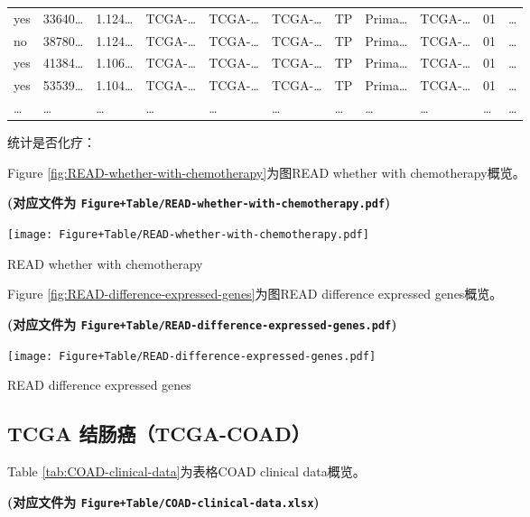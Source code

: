 \documentclass[
]{article}
\begin{document}
\begin{longtable}[]{@{}lllllllllll@{}}
yes & 33640\ldots{} & 1.124\ldots{} & TCGA-\ldots{} & TCGA-\ldots{} & TCGA-\ldots{} & TP & Prima\ldots{} & TCGA-\ldots{} & 01 & \ldots{}\tabularnewline
no & 38780\ldots{} & 1.124\ldots{} & TCGA-\ldots{} & TCGA-\ldots{} & TCGA-\ldots{} & TP & Prima\ldots{} & TCGA-\ldots{} & 01 & \ldots{}\tabularnewline
yes & 41384\ldots{} & 1.106\ldots{} & TCGA-\ldots{} & TCGA-\ldots{} & TCGA-\ldots{} & TP & Prima\ldots{} & TCGA-\ldots{} & 01 & \ldots{}\tabularnewline
yes & 53539\ldots{} & 1.104\ldots{} & TCGA-\ldots{} & TCGA-\ldots{} & TCGA-\ldots{} & TP & Prima\ldots{} & TCGA-\ldots{} & 01 & \ldots{}\tabularnewline
\ldots{} & \ldots{} & \ldots{} & \ldots{} & \ldots{} & \ldots{} & \ldots{} & \ldots{} & \ldots{} & \ldots{} & \ldots{}\tabularnewline
\bottomrule
\end{longtable}

统计是否化疗：

Figure \ref{fig:READ-whether-with-chemotherapy}为图READ whether with chemotherapy概览。

\textbf{(对应文件为 \texttt{Figure+Table/READ-whether-with-chemotherapy.pdf})}

\def\@captype{figure}
\begin{center}
\texttt{[image: Figure+Table/READ-whether-with-chemotherapy.pdf]}
\caption{READ whether with chemotherapy}\label{fig:READ-whether-with-chemotherapy}
\end{center}

Figure \ref{fig:READ-difference-expressed-genes}为图READ difference expressed genes概览。

\textbf{(对应文件为 \texttt{Figure+Table/READ-difference-expressed-genes.pdf})}

\def\@captype{figure}
\begin{center}
\texttt{[image: Figure+Table/READ-difference-expressed-genes.pdf]}
\caption{READ difference expressed genes}\label{fig:READ-difference-expressed-genes}
\end{center}

\hypertarget{tcga-ux7ed3ux80a0ux764ctcga-coad}{%
\subsection{TCGA 结肠癌（TCGA-COAD）}\label{tcga-ux7ed3ux80a0ux764ctcga-coad}}

Table \ref{tab:COAD-clinical-data}为表格COAD clinical data概览。

\textbf{(对应文件为 \texttt{Figure+Table/COAD-clinical-data.xlsx})}
\end{document}
